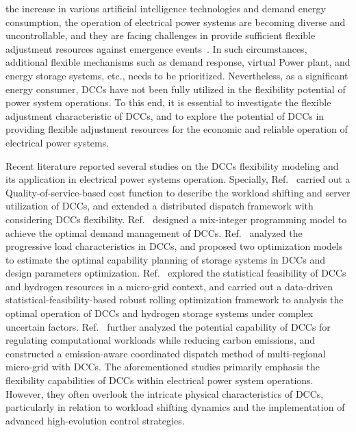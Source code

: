 \documentclass[lettersize,journal]{IEEEtran}
\begin{document}
 the increase in various artificial intelligence technologies and demand energy consumption, the operation of electrical power systems are becoming diverse and uncontrollable, and they are facing challenges in provide sufficient flexible adjustment resources against emergence events~\cite{6041050,7039172}. In such circumstances, additional flexible mechanisms such as demand response, virtual Power plant, and energy storage systems, etc., needs to be prioritized. Nevertheless, as a significant energy consumer, DCCs have not been fully utilized in the flexibility potential of power system operations. To this end, it is essential to investigate the flexible adjustment characteristic of DCCs, and to explore the potential of DCCs in providing flexible adjustment resources for the economic and reliable operation of electrical power systems.

Recent literature reported several studies on the DCCs flexibility modeling and its application in electrical power systems operation. Specially,
Ref.~\cite{10874152} carried out a Quality-of-service-based cost function to describe the workload shifting and server utilization of DCCs, and extended a distributed dispatch framework with considering DCCs flexibility.
Ref.~\cite{6041050} designed a mix-integer programming model to achieve the optimal demand management of DCCs.
Ref.~\cite{7039172} analyzed the progressive load characteristics in DCCs, and proposed two optimization models to estimate the optimal capability planning of storage systems in DCCs and design parameters optimization.
Ref.~\cite{10806734} explored the statistical feasibility of DCCs and hydrogen resources in a micro-grid context, and carried out a data-driven statistical-feasibility-based robust rolling optimization framework to analysis the optimal operation of DCCs and hydrogen storage systems under complex uncertain factors.
Ref.~\cite{doi:10.1049/icp.2025.0664} further analyzed the potential capability of DCCs for regulating computational workloads while reducing carbon emissions, and constructed a emission-aware coordinated dispatch method of multi-regional micro-grid with DCCs.
The aforementioned studies primarily emphasis the flexibility capabilities of DCCs within electrical power system operations. However, they often overlook the intricate physical characteristics of DCCs, particularly in relation to workload shifting dynamics and the implementation of advanced high-evolution control strategies.
\end{document}
